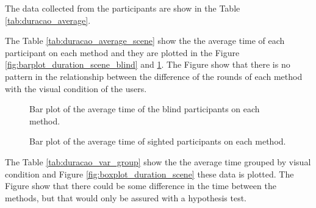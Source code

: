 
The data collected from the participants are show in the Table \ref{tab:duracao_average}.



The Table \ref{tab:duracao_average_scene} show the the average time of each participant on each method and they are plotted in the Figure \ref{fig:barplot_duration_scene_blind} and \ref{fig:barplot_duration_scene_sight}. The Figure show that there is no pattern in the relationship between the difference of the rounds of each method with the visual condition of the users. 



\begin{figure}[!htb]
    \centering
        \begin{minipage}{\textwidth}
        \centering
        \resizebox{0.8\linewidth}{!}{
        
        }
        \caption{Bar plot of the average time of the blind participants on each method.}
        \label{fig:barplot_duration_scene_blind}
    \end{minipage}
    \begin{minipage}{\textwidth}
        \centering
        \resizebox{0.8\linewidth}{!}{
        
        }
        \caption{Bar plot of the average time of sighted participants on each method.}
        \label{fig:barplot_duration_scene_sight}
    \end{minipage}
\end{figure}


The Table \ref{tab:duracao_var_group} show the the average time grouped by visual condition and Figure \ref{fig:boxplot_duration_scene} these data is plotted. The Figure show that there could be some difference in the time between the methods, but that would only be assured with a hypothesis test. 

